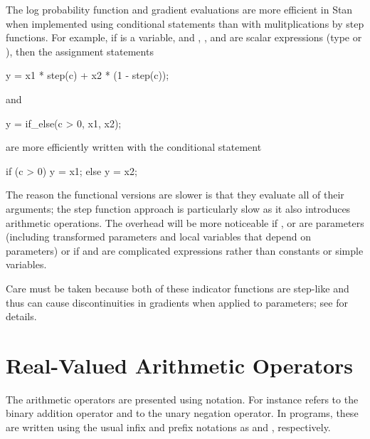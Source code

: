 The log probability function and gradient evaluations are more
efficient in Stan when implemented using conditional statements than
with mulitplications by step functions.  For example, if  is a
 variable, and , , and  are
scalar expressions (type  or ), then the
assignment statements
%
\begin{stancode}
y = x1 * step(c) + x2 * (1 - step(c));
\end{stancode}
%
and
%
\begin{stancode}
y = if_else(c > 0, x1, x2);
\end{stancode}
%
are more efficiently written with the conditional statement
%
\begin{stancode}
if (c > 0)
  y = x1;
else
  y = x2;
\end{stancode}
%
The reason the functional versions are slower is that they evaluate
all of their arguments; the step function approach is particularly
slow as it also introduces arithmetic operations.  The overhead will
be more noticeable if ,  or 
are parameters (including transformed parameters and local variables
that depend on parameters) or if  and  are
complicated expressions rather than constants or simple variables.  
%
\begin{description}
\end{description}
%
\begin{description}
\end{description}
%
Care must be taken because both of these indicator functions are
step-like and thus can cause discontinuities in gradients when applied
to parameters; see  for details.

\section{Real-Valued Arithmetic Operators}\label{real-valued-arithmetic-operators.section}

The arithmetic operators are presented using \Cpp notation.  For
instance  refers to the binary addition operator
and  to the unary negation operator.  In \Stan
programs, these are written using the usual infix and prefix notations
as  and , respectively.

